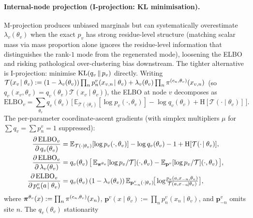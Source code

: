 \paragraph{Internal-node projection (I-projection: KL minimisation).}
M-projection produces unbiased marginals but can systematically
overestimate $\lambda_v(\theta_v)$ when the exact $p_v$ has strong
residue-level structure (matching scalar mass via mass proportion
alone ignores the residue-level information that distinguishes the
rank-$1$ mode from the regenerated mode), loosening the ELBO and
risking pathological over-clustering bias downstream. The tighter
alternative is I-projection: minimise $\mathrm{KL}(q_v\,\|\,p_v)$ directly.
Writing
$\mathcal{T}(x_v\!\mid\theta_v) := (1-\lambda_v(\theta_v))\prod_n p_n^v(x_{v,n}\!\mid\theta_v)
                                  + \lambda_v(\theta_v)\prod_n \pi^{(c_n,\theta_v)}(x_{v,n})$
(so $q_v(x_v,\theta_v)=q_v(\theta_v)\mathcal{T}(x_v\!\mid\theta_v)$),
the ELBO at node $v$ decomposes as
\begin{equation}
  \mathrm{ELBO}_v = \sum_{\theta_v} q_v(\theta_v)\,\big[\,\mathbb{E}_{\mathcal{T}(\cdot|\theta_v)}[\log p_v(\cdot,\theta_v)] - \log q_v(\theta_v) + \mathrm{H}[\mathcal{T}(\cdot\!\mid\theta_v)]\,\big].
  \label{eq:elbo-node}
\end{equation}
The per-parameter coordinate-ascent gradients (with simplex
multipliers $\mu$ for $\sum q_v = \sum p_n^v = 1$ suppressed):
\begin{align}
  \frac{\partial\,\mathrm{ELBO}_v}{\partial\,q_v(\theta_v)}
    &= \mathbb{E}_{\mathcal{T}(\cdot|\theta_v)}[\log p_v(\cdot,\theta_v)] - \log q_v(\theta_v) - 1 + \mathrm{H}[\mathcal{T}(\cdot\!\mid\theta_v)],
    \label{eq:dql-dq}\\
  \frac{\partial\,\mathrm{ELBO}_v}{\partial\,\lambda_v(\theta_v)}
    &= q_v(\theta_v)\,\big[\,\mathbb{E}_{\boldsymbol{\pi}^{\theta_v}}[\log p_v/\mathcal{T}](\cdot,\theta_v) - \mathbb{E}_{\mathbf{p}^v}[\log p_v/\mathcal{T}](\cdot,\theta_v)\,\big],
    \label{eq:dql-dlambda}\\
  \frac{\partial\,\mathrm{ELBO}_v}{\partial\,p_n^v(a\!\mid\theta_v)}
    &= q_v(\theta_v)\,(1-\lambda_v(\theta_v))\,\mathbb{E}_{\mathbf{p}_{-n}^v(\cdot|\theta_v)}\!\big[\log\!\tfrac{p_v(a,x_{-n},\theta_v)}{\mathcal{T}(a,x_{-n}\!\mid\theta_v)}\big],
    \label{eq:dql-dp}
\end{align}
where $\boldsymbol{\pi}^{\theta_v}(x) := \prod_n \pi^{(c_n,\theta_v)}(x_n)$,
$\mathbf{p}^v(x\!\mid\theta_v) := \prod_n p_n^v(x_n\!\mid\theta_v)$, and
$\mathbf{p}_{-n}^v$ omits site $n$. The $q_v(\theta_v)$ stationarity
